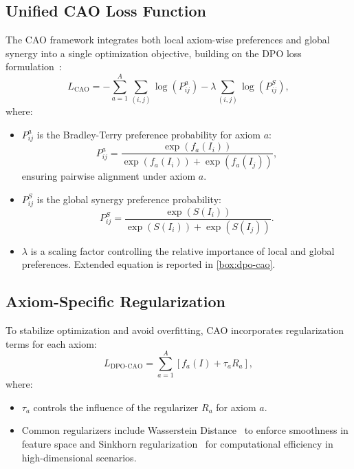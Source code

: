 \subsection{Unified CAO Loss Function}
The CAO framework integrates both local axiom-wise preferences and global synergy into a single optimization objective, building on the DPO loss formulation~\cite{rafailov2024directpreferenceoptimizationlanguage}:
\[
L_{\text{CAO}} = -\sum_{a=1}^A \sum_{(i, j)} \log(P^a_{ij}) - \lambda \sum_{(i, j)} \log(P^S_{ij}),
\]
where:
\begin{itemize}
    \item $P^a_{ij}$ is the Bradley-Terry preference probability for axiom $a$:
    \[
    P^a_{ij} = \frac{\exp(f_a(I_i))}{\exp(f_a(I_i)) + \exp(f_a(I_j))},
    \]
    ensuring pairwise alignment under axiom $a$.  
    \item $P^S_{ij}$ is the global synergy preference probability:
    \[
    P^S_{ij} = \frac{\exp(S(I_i))}{\exp(S(I_i)) + \exp(S(I_j))}.
    \]
    \item $\lambda$ is a scaling factor controlling the relative importance of local and global preferences. Extended equation is reported in \ref{box:dpo-cao}.
\end{itemize}

\subsection{Axiom-Specific Regularization}
To stabilize optimization and avoid overfitting, CAO incorporates regularization terms for each axiom:
\[
L_{\text{DPO-CAO}} = \sum_{a=1}^A \left[ f_a(I) + \tau_a R_a \right],
\]
where:
\begin{itemize}
    \item $\tau_a$ controls the influence of the regularizer $R_a$ for axiom $a$.  
    \item Common regularizers include Wasserstein Distance~\cite{villani2008optimal} to enforce smoothness in feature space and Sinkhorn regularization~\cite{cuturi2013sinkhorn} for computational efficiency in high-dimensional scenarios.
\end{itemize}




\newpage
\onecolumn

